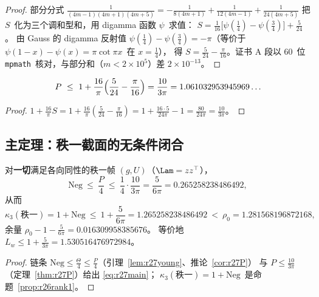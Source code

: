 \begin{proof}
部分分式 $\frac1{(4m-1)(4m+1)(4m+5)}=-\frac1{8(4m+1)}+\frac1{12(4m-1)}+\frac1{24(4m+5)}$
把 $S$~化为三个调和型和，用 digamma 函数 $\psi$~求值：
$S=\frac1{16}\bigl[\psi(\tfrac14)-\psi(\tfrac34)\bigr]+\frac5{24}$。
由 Gauss 的 digamma 反射值 $\psi(\tfrac14)-\psi(\tfrac34)=-\pi$（等价于 $\psi(1-x)-\psi(x)=\pi\cot\pi x$~在 $x=\frac14$），
得 $S=\frac5{24}-\frac\pi{16}$。证书 A 段以 $60$~位 \texttt{mpmath}~核对，与部分和（$m<2\times10^5$）差 $2\times10^{-13}$。
\end{proof}

\begin{theorem}[$P$~的闭合上界]\label{thm:r27P}
\begin{equation}\label{eq:r27Pclosed}
P\ \le\ 1+\frac{16}\pi\Bigl(\frac5{24}-\frac\pi{16}\Bigr)=\frac{10}{3\pi}=1.061032953945969\ldots
\end{equation}
\end{theorem}

\begin{proof}
$1+\frac{16}\pi S=1+\frac{16}\pi(\frac5{24}-\frac\pi{16})=1+\frac{16\cdot5}{24\pi}-1=\frac{80}{24\pi}=\frac{10}{3\pi}$。
\end{proof}

\subsection{主定理：秩一截面的无条件闭合}\label{sec:r27:main}

\begin{theorem}\label{thm:r27main}
对\textbf{一切}满足各向同性的秩一帧 $(g,U)$（$\Lam=zz^\top$），
\begin{equation}\label{eq:r27main}
\mathrm{Neg}\ \le\ \frac P4\ \le\ \frac14\cdot\frac{10}{3\pi}=\frac5{6\pi}=0.265258238486492,
\end{equation}
从而
\begin{equation}\label{eq:r27concl}
\kappa_3(\text{秩一})=1+\mathrm{Neg}\ \le\ 1+\frac5{6\pi}=1.265258238486492\ <\ \rho_0=1.281568196872168,
\end{equation}
余量 $\rho_0-1-\frac5{6\pi}=0.016309958385676$。
等价地 $L_w\le1+\frac5{3\pi}=1.530516476972984$。
\end{theorem}

\begin{proof}
链条 $\mathrm{Neg}\le\frac\Theta4\le\frac P4$（引理~\ref{lem:r27young}、推论~\ref{cor:r27P}）
与 $P\le\frac{10}{3\pi}$（定理~\ref{thm:r27P}）给出 \eqref{eq:r27main}；
$\kappa_3(\text{秩一})=1+\mathrm{Neg}$~是命题~\ref{prop:r26rank1}。
\end{proof}

